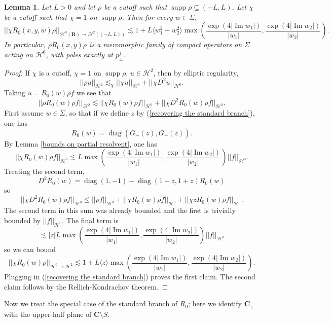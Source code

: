 \documentclass[reqno,12pt,letterpaper]{amsart}
\newcommand{\RR}{\mathbf{R}}
\newcommand{\CC}{\mathbf{C}}
\DeclareMathOperator{\diag}{diag}
\DeclareMathOperator{\supp}{supp}
\renewcommand{\Im}{\operatorname{Im}}
\newtheorem{lemma}[theorem]{Lemma}
\theoremstyle{definition}
\begin{document}
\begin{lemma}
\label{exponential bound on free resolvent}
Let $L > 0$ and let $\rho$ be a cutoff such that $\supp \rho \subseteq (-L, L)$.
Let $\chi$ be a cutoff such that $\chi = 1$ on $\supp \rho$.
Then for every $w \in \Sigma$,
$$||\chi R_0(x, y, w) \rho||_{\mathcal H^0(\RR) \to \mathcal H^2((-L, L))} \lesssim 1 + L\langle w_1^2 - w_2^2\rangle\max\left(\frac{\exp(4 |\Im w_1|)}{|w_1|}, \frac{\exp(4 |\Im w_2|)}{|w_2|} \right).$$
In particular, $\rho R_0(x, y) \rho$ is a meromorphic family of compact operators on $\Sigma$ acting on $\mathcal H^0$, with poles exactly at $p_\pm^j$.
\end{lemma}
\begin{proof}
If $\chi$ is a cutoff, $\chi = 1$ on $\supp \rho$, $u \in \mathcal H^2$, then by elliptic regularity,
$$||\rho u||_{\mathcal H^2} \lesssim_\chi ||\chi u||_{\mathcal H^0} + ||\chi D^2 u||_{\mathcal H^0}.$$
Taking $u = R_0(w)\rho f$ we see that
$$||\rho R_0(w)\rho f||_{\mathcal H^2} \lesssim ||\chi R_0(w) \rho f||_{\mathcal H^0} + ||\chi D^2 R_0(w) \rho f||_{\mathcal H^0}.$$
First assume $w \in \mathring \Sigma$, so that if we define $z$ by (\ref{recovering the standard branch}), one has
$$R_0(w) = \diag(G_+(z), G_-(z)).$$
By Lemma \ref{bounds on partial resolvent}, one has
$$||\chi R_0(w) \rho f||_{\mathcal H^0} \lesssim L \max\left(\frac{\exp(4 |\Im w_1|)}{|w_1|}, \frac{\exp(4 |\Im w_2|)}{|w_2|} \right) ||f||_{\mathcal H^0}.$$
Treating the second term,
$$D^2R_0(w) = \diag(1, - 1) - \diag(1-z,1+z)R_0(w)$$
so
$$||\chi D^2 R_0(w) \rho f||_{\mathcal H^0} \leq ||\rho f||_{\mathcal H^0} + ||\chi R_0(w) \rho f||_{\mathcal H^0} + ||\chi z R_0(w) \rho f||_{\mathcal H^0}.$$
The second term in this sum was already bounded and the first is trivially bounded by $||f||_{\mathcal H^0}$.
The final term is
$$\lesssim |z|L \max\left(\frac{\exp(4 |\Im w_1|)}{|w_1|}, \frac{\exp(4 |\Im w_2|)}{|w_2|} \right) ||f||_{\mathcal H^0}$$
so we can bound
$$||\chi R_0(w) \rho||_{\mathcal H^0 \to \mathcal H^2} \lesssim 1 + L\langle z\rangle\max\left(\frac{\exp(4 |\Im w_1|)}{|w_1|}, \frac{\exp(4 |\Im w_2|)}{|w_2|} \right).$$
Plugging in (\ref{recovering the standard branch}) proves the first claim.
The second claim follows by the Rellich-Kondrachov theorem.
\end{proof}

Now we treat the special case of the standard branch of $R_0$; here we identify $\CC_+$ with the upper-half plane of $\CC \setminus S$.
\end{document}
